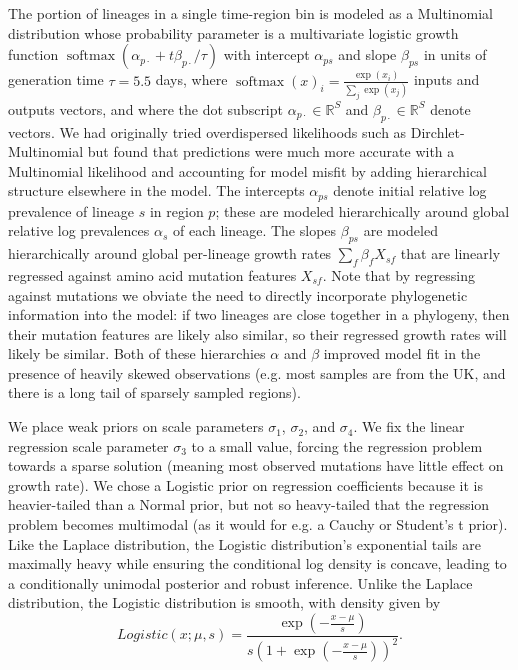 \documentclass[12pt]{article}
\newcommand \blank {{\,\pmb\cdot\,}}
\begin{document}
The portion of lineages in a single time-region bin is modeled as a Multinomial distribution whose probability parameter is a multivariate logistic growth function $\operatorname{softmax}(\alpha_{p\blank} + t\beta_{p\blank}/\tau)$ with intercept $\alpha_{ps}$ and slope $\beta_{ps}$ in units of generation time $\tau=5.5$ days, where
$
  \operatorname{softmax}(x)_i = \frac {\exp(x_i)} {\sum_j \exp(x_j)}
$
inputs and outputs vectors, and where the dot subscript $\alpha_{p\blank}\in\mathbb R^S$ and $\beta_{p\blank}\in\mathbb R^S$ denote vectors.
We had originally tried overdispersed likelihoods such as Dirchlet-Multinomial but found that predictions were much more accurate with a Multinomial likelihood and accounting for model misfit by adding hierarchical structure elsewhere in the model.
The intercepts $\alpha_{ps}$ denote initial relative log prevalence of lineage $s$ in region $p$; these are modeled hierarchically around global relative log prevalences $\alpha_s$ of each lineage.
The slopes $\beta_{ps}$ are modeled hierarchically around global per-lineage growth rates $\sum_f \beta_f X_{sf}$ that are linearly regressed against amino acid mutation features $X_{sf}$.
Note that by regressing against mutations we obviate the need to directly incorporate phylogenetic information into the model: if two lineages are close together in a phylogeny, then their mutation features are likely also similar, so their regressed growth rates will likely be similar.
Both of these hierarchies $\alpha$ and $\beta$ improved model fit in the presence of heavily skewed observations (e.g. most samples are from the UK, and there is a long tail of sparsely sampled regions).

We place weak priors on scale parameters $\sigma_1$, $\sigma_2$, and $\sigma_4$.
We fix the linear regression scale parameter $\sigma_3$ to a small value, forcing the regression problem towards a sparse solution (meaning most observed mutations have little effect on growth rate).
We chose a Logistic prior on regression coefficients because it is heavier-tailed than a Normal prior, but not so heavy-tailed that the regression problem becomes multimodal (as it would for e.g. a Cauchy or Student's t prior).
Like the Laplace distribution, the Logistic distribution's exponential tails are maximally heavy while ensuring the conditional log density is concave, leading to a conditionally unimodal posterior and robust inference.
Unlike the Laplace distribution, the Logistic distribution is smooth, with density given by
$$
Logistic(x;\mu,s) = \frac {\exp(-\frac{x-\mu}s)}{s(1 + \exp(-\frac{x-\mu}s))^2}.
$$
\end{document}
